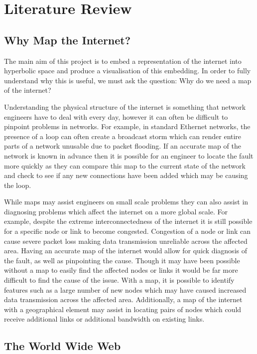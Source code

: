 \chapter{Literature Review}
\label{cha:LitReview}

\section{Why Map the Internet?}
\label{sec:LitReviewWhyMap}

The main aim of this project is to embed a representation of the internet into hyperbolic space and produce a visualisation of this embedding. In order to fully understand why this is useful, we must ask the question: Why do we need a map of the internet? 

Understanding the physical structure of the internet is something that network engineers have to deal with every day, however it can often be difficult to pinpoint problems in networks. For example, in standard Ethernet networks, the presence of a loop can often create a broadcast storm which can render entire parts of a network unusable due to packet flooding. If an accurate map of the network is known in advance then it is possible for an engineer to locate the fault more quickly as they can compare this map to the current state of the network and check to see if any new connections have been added which may be causing the loop. 

While maps may assist engineers on small scale problems they can also assist in diagnosing problems which affect the internet on a more global scale. For example, despite the extreme interconnectedness of the internet it is still possible for a specific node or link to become congested. Congestion of a node or link can cause severe packet loss making data transmission unreliable across the affected area. Having an accurate map of the internet would allow for quick diagnosis of the fault, as well as pinpointing the cause. Though it may have been possible without a map to easily find the affected nodes or links it would be far more difficult to find the cause of the issue. With a map, it is possible to identify features such as a large number of new nodes which may have caused increased data transmission across the affected area. Additionally, a map of the internet with a geographical element may assist in locating pairs of nodes which could receive additional links or additional bandwidth on existing links.

\section{The World Wide Web}

